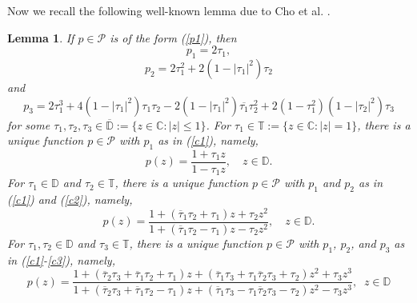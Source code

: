 \documentclass[10pt,a4paper]{amsart}
\newtheorem{lem}{Lemma}[section]
\newcommand{\ol}{\overline}
\numberwithin{equation}{section}
\begin{document}
Now we recall the following well-known lemma due to Cho et al. \cite{C12}.
\begin{lem}\label{L1} \cite[Lemma 2.4]{C12} If $p\in\mathcal{P}$ is of the form (\ref{p1}), then
\begin{equation}\label{c1}p_1 =2\tau_1,\end{equation}
\begin{equation}\label{c2} p_2=2\tau_1^2 + 2(1 - |\tau_1|^2)\tau_2\end{equation}
and
\begin{equation}\label{c3} p_3 = 2\tau_1^3+4(1-|\tau_1|^2)\tau_1\tau_2 - 2(1 - |\tau_1|^2)\ol{\tau_1}\tau_2^2 + 2(1 - \tau_1^2)(1 - |\tau_2|^2)\tau_3
\end{equation}
for some $\tau_1, \tau_2, \tau_3 \in\mathbb{\ol D}:= \{z \in \mathbb{C}: |z| \le 1 \}$.
For $ \tau_1 \in \mathbb{T} := \{ z \in \mathbb{C} : |z| = 1 \} $, there is a unique function $ p \in \mathcal{P} $ with $ p_1 $ as in (\ref{c1}), namely,
\[
p(z) = \frac{1 + \tau_1 z}{1 - \tau_1 z}, \quad z \in \mathbb{D}.
\]
For $ \tau_1 \in \mathbb{D} $ and $ \tau_2 \in \mathbb{T} $, there is a unique function $ p \in \mathcal{P} $ with $ p_1 $ and $ p_2 $ as in (\ref{c1}) and (\ref{c2}), namely,
\[
p(z) = \frac{1 + (\ol \tau_1 \tau_2 + \tau_1) z + \tau_2 z^2}{1 + (\ol \tau_1 \tau_2 - \tau_1) z - \tau_2 z^2}, \quad z \in \mathbb{D}.
\]
For $ \tau_1, \tau_2 \in \mathbb{D} $ and $ \tau_3 \in \mathbb{T} $, there is a unique function $ p \in \mathcal{P} $ with $ p_1 $, $ p_2 $, and $ p_3 $ as in (\ref{c1}-\ref{c3}), namely,
\[
p(z) = \frac{1 + (\ol\tau_2 \tau_3 + \ol\tau_1 \tau_2 + \tau_1)z+(\ol\tau_1\tau_3+\tau_1\ol\tau_2\tau_3+\tau_2)z^2+\tau_3z^3}{1+(\ol\tau_2\tau_3+\ol\tau_1\tau_2-\tau_1)z+(\ol\tau_1\tau_3-\tau_1\ol\tau_2\tau_3-\tau_2)z^2-\tau_3z^3},\;\;z\in\mathbb{D}
\]
\end{lem}
\end{document}
